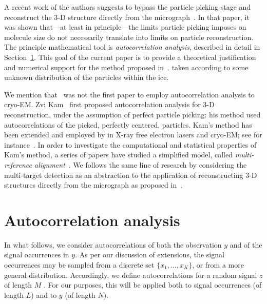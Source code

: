 \documentclass[12pt]{article}
\newcommand{\1}{\mathbf{1}}
\theoremstyle{plain}
\theoremstyle{definition}
\theoremstyle{remark}
\theoremstyle{plain}
\theoremstyle{remark}
\theoremstyle{plain}
\theoremstyle{plain}
\theoremstyle{plain}
\numberwithin{equation}{section}
\begin{document}
A recent work of the authors suggests to bypass the particle picking stage and  reconstruct the 3-D structure directly from the micrograph~\cite{bendory2018toward}.
In that paper, it was shown that---at least in principle---the limits particle picking imposes on molecule size do not necessarily  translate into limits on particle reconstruction.
The principle mathematical tool is  \emph{autocorrelation analysis}, described in detail in Section~\ref{sec:AC_analysis}.
This goal of  the current paper is to provide a theoretical justification and numerical support  for the method proposed in~\cite{bendory2018toward}.  
taken according to some unknown distribution of the particles within the ice.


We mention that~\cite{bendory2018toward} was not the first paper to employ autocorrelation analysis to cryo-EM. 
Zvi Kam~\cite{kam1980reconstruction} first proposed autocorrelation analysis for \mbox{3-D} reconstruction, under the assumption of perfect particle picking: his method used autocorrelations of the picked, perfectly centered, particles. Kam's method has been extended and employed by in X-ray free electron lasers and cryo-EM; see for instance~\cite{liu2013three,kurta2017correlations,levin20173d,von2018structure}.  
In order to investigate the computational and statistical properties of Kam's method, a series of papers have studied a simplified model, 
called   \emph{multi-reference alignment}~\cite{bandeira2014multireference,bendory2017bispectrum,bandeira2017optimal,perry2017sample,bandeira2017estimation,abbe2017multireference}.
We follows the same line of research by considering the multi-target detection as an abstraction to the application of reconstructing 3-D structures directly from the micrograph as proposed in~\cite{bendory2018toward}.

\section{Autocorrelation analysis} \label{sec:AC_analysis}

In what follows, we consider autocorrelations of both the observation $y$ and of the signal occurrences in $y$. As per our discussion of extensions, the signal occurrences may be sampled from a discrete set $\{x_1, \ldots, x_K\}$, or from a more general distribution. Accordingly, we define autocorrelations for a random signal $z$ of length $M$ . For our purposes, this will be applied both to signal occurrences (of length $L$) and to $y$ (of length $N$).
\end{document}
